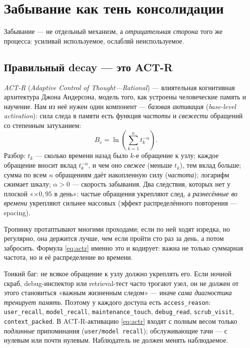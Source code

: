 \section{Забывание как тень консолидации}
\label{sec:decay}

Забывание --- не отдельный механизм, а \emph{отрицательная сторона} того же
процесса: усиливай используемое, ослабляй неиспользуемое.

\subsection{Правильный decay --- это ACT-R}

\emph{ACT-R} (\textit{Adaptive Control of Thought---Rational}) --- влиятельная
когнитивная архитектура Джона Андерсона, модель того, как устроены
человеческие память и научение. Нам из неё нужен один компонент ---
\emph{базовая активация} (\textit{base-level activation}): сила следа в памяти
есть функция \emph{частоты} и \emph{свежести} обращений со степенным
затуханием:
\begin{equation}
B_v = \ln\!\left(\sum_{k=1}^{n} t_k^{-\alpha}\right).
\label{eq:actr}
\end{equation}
Разбор: $t_k$ --- сколько времени назад было $k$-е обращение к узлу; каждое
обращение вносит вклад $t_k^{-\alpha}$, и чем оно \emph{свежее}
(меньше $t_k$), тем вклад больше; сумма по всем $n$ обращениям даёт
накопленную силу (\emph{частота}); логарифм сжимает шкалу; $\alpha > 0$ ---
скорость забывания. Два следствия, которых нет у плоской «$\times 0,95$ в
день»: частые обращения укрепляют след, а \emph{разнесённые во времени}
укрепляют сильнее массовых (эффект распределённого повторения --- spacing).

\begin{intuition}
Тропинку протаптывают многими проходами; если по ней ходят изредка, но
регулярно, она держится лучше, чем если пройти сто раз за день, а потом
забросить. Формула \eqref{eq:actr} именно это и кодирует: важна не только
суммарная частота, но и её распределение во времени.
\end{intuition}

\begin{pitfall}
Тонкий баг: не всякое обращение к узлу должно укреплять его. Если ночной
скраб, debug-инспектор или retrieval-тест часто трогают узел, он не должен от
этого становиться «важным жизненным следом» --- иначе \emph{сама диагностика
тренирует память}. Поэтому у каждого доступа есть \texttt{access\_reason}:
\texttt{user\_recall}, \texttt{model\_recall}, \texttt{maintenance\_touch},
\texttt{debug\_read}, \texttt{scrub\_visit}, \texttt{context\_packed}. В
ACT-R-активацию \eqref{eq:actr} входят с полным весом только \emph{подлинные}
припоминания (\texttt{user/model recall}); обслуживающие тачи --- с нулевым
или почти нулевым. Наблюдатель не должен менять наблюдаемое.
\end{pitfall}

